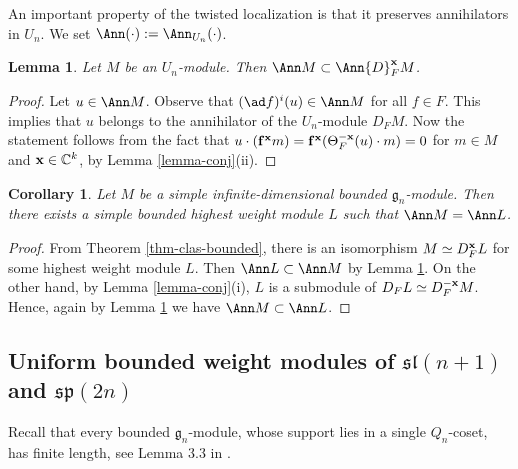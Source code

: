 \documentclass[12pt]{amsart}
\def\gg{\mathfrak{g}}
\newtheorem{lem}[thm]{Lemma}
\newtheorem{cor}[thm]{Corollary}
\begin{document}
An important property of the twisted localization is that it preserves annihilators in $U_n$. We set $\Ann (\cdot):= \Ann_{U_n}(\cdot)$.
\begin{lem} \label{lem-loc-ann}
Let $M$ be an $U_n$-module. Then $\Ann M \subset \Ann {D}_{F}^{\bf x}  M$.
\end{lem}
\begin{proof}
Let $u \in \Ann M$. Observe that $(\ad f)^i(u) \in \Ann M$ for all $f\in F$. This implies that  $u$ belongs to the annihilator of the $U_n$-module $ {D}_{F} M$. Now 
the statement follows from the fact that $u \cdot ({\bf f}^{\bf x}m) = {\bf f}^{\bf x} (\Theta_{F}^{\bf -x}(u) \cdot m) = 0$ for $m \in M$ and ${\bf x} \in {\mathbb C}^k$,  by Lemma \ref{lemma-conj}(ii).
\end{proof}

\begin{cor}
Let $M$ be a simple infinite-dimensional bounded $\gg_n$-module. Then there exists a simple bounded highest weight module $L$ such that $\Ann M = \Ann L$.
\end{cor}
\begin{proof}
From Theorem \ref{thm-clas-bounded},  there is an isomorphism $M \simeq  {D}_{F}^{\bf x}  L$ for some highest weight module $L$. Then  $\Ann L \subset \Ann M$ by Lemma \ref{lem-loc-ann}. On the other hand, by Lemma \ref{lemma-conj}(i), $L$ is a submodule of ${D}_{F} L \simeq   {D}_{F}^{\bf -x} M$. Hence, again by  Lemma \ref{lem-loc-ann} we have  $\Ann M \subset \Ann L$.
\end{proof}








\subsection{Uniform bounded weight modules of $\mathfrak{sl}({n+1})$ and $\mathfrak{sp}({2n})$} \label{subsec-properties} Recall that every bounded  $\gg_n$-module, whose support lies in a single $Q_n$-coset,  has finite length, see   Lemma 3.3 in \cite{M}.
\end{document}
